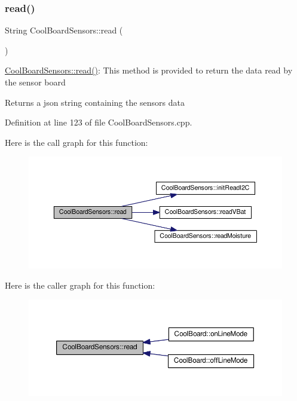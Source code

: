 \subsubsection{\texorpdfstring{read()}{read()}}
{\footnotesize\ttfamily String Cool\+Board\+Sensors\+::read (\begin{DoxyParamCaption}{ }\end{DoxyParamCaption})}

\hyperlink{class_cool_board_sensors_a91badb2539d91fda8679f2a597874c48}{Cool\+Board\+Sensors\+::read()}\+: This method is provided to return the data read by the sensor board

\begin{DoxyReturn}{Returns}
a json string containing the sensors data 
\end{DoxyReturn}


Definition at line 123 of file Cool\+Board\+Sensors.\+cpp.

Here is the call graph for this function\+:\nopagebreak
\begin{figure}[H]
\begin{center}
\leavevmode
\includegraphics[width=350pt]{class_cool_board_sensors_a91badb2539d91fda8679f2a597874c48_cgraph}
\end{center}
\end{figure}
Here is the caller graph for this function\+:\nopagebreak
\begin{figure}[H]
\begin{center}
\leavevmode
\includegraphics[width=350pt]{class_cool_board_sensors_a91badb2539d91fda8679f2a597874c48_icgraph}
\end{center}
\end{figure}
\mbox{\label{class_cool_board_sensors_a8761bff50373c485f4465c8db47d0633}} 
